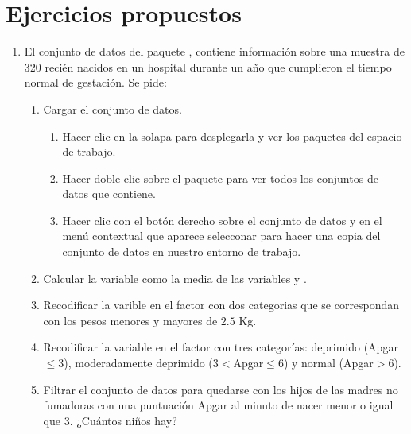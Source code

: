 \section{Ejercicios propuestos}
\begin{enumerate}[leftmargin=*]
\item  El conjunto de datos  del paquete , contiene información sobre una
muestra de 320 recién nacidos en un hospital durante un año que cumplieron el tiempo normal de gestación. 
Se pide:
\begin{enumerate}
\item Cargar el conjunto de datos.
\begin{indicacion}{
\begin{enumerate}
\item Hacer clic en la solapa  para desplegarla y ver los paquetes del espacio de trabajo. 
\item Hacer doble clic sobre el paquete  para ver todos los conjuntos de datos que contiene. 
\item Hacer clic con el botón derecho sobre el conjunto de datos  y en el menú contextual que
aparece selecconar  para hacer una copia del conjunto de datos en nuestro entorno de trabajo. 
\end{enumerate}
}
\end{indicacion}

\item Calcular la variable  como la media de las variables  y .
\item Recodificar la varible  en el factor  con dos categorias que se
correspondan con los pesos menores y mayores de $2.5$ Kg.
\item Recodificar la variable  en el factor  con tres categorías: deprimido
(Apgar$\leq 3$), moderadamente deprimido ($3<$Apgar$\leq 6$) y normal (Apgar$>6$).
\item Filtrar el conjunto de datos para quedarse con los hijos de las madres no fumadoras con una puntuación Apgar al
minuto de nacer menor o igual que 3. ¿Cuántos niños hay?
\end{enumerate}
\end{enumerate}